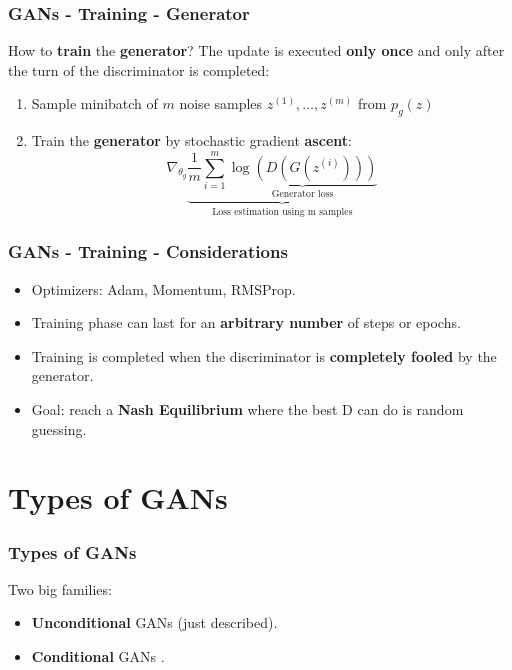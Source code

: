 \documentclass{beamer}
\begin{document}
\begin{frame}
	\frametitle{GANs - Training - Generator}
	How to \textbf{train} the \textbf{generator}? \newline
	The update is executed \textbf{only once} and only after the turn of the discriminator is completed:
	\begin{enumerate}
		\item Sample minibatch of $m$ noise samples ${z^{(1)},\dots,z^{(m)}}$ from $p_g(z)$
		\item Train the \textbf{generator} by stochastic gradient \textbf{ascent}:
			$$
			\nabla_{\theta_g} \underbrace{\frac{1}{m} \sum_{i=1}^{m} \underbrace{\log(D(G(z^{(i)})))}_{\text{Generator loss}}}_{\text{Loss estimation using m samples}}
			$$
	\end{enumerate}
\end{frame} 

\begin{frame}
	\frametitle{GANs - Training - Considerations}
	\begin{itemize}
		\item Optimizers: Adam, Momentum, RMSProp.
		\item Training phase can last for an \textbf{arbitrary number} of steps or epochs.
		\item Training is completed when the discriminator is \textbf{completely fooled} by the generator.
		\item Goal: reach a \textbf{Nash Equilibrium} where the best D can do is random guessing.
	\end{itemize}
 \end{frame}
 
\section{Types of GANs}

\begin{frame}
	\frametitle{Types of GANs}
	Two big families:
	\begin{itemize}
		\item \textbf{Unconditional} GANs (just described).
		\item \textbf{Conditional} GANs \citep{mirzaConditionalGenerativeAdversarial2014}.
	\end{itemize}
\end{frame}
\end{document}
